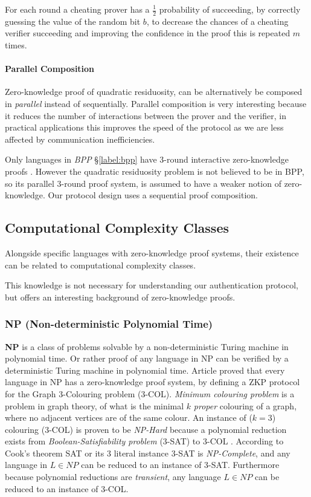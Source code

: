 For each round a cheating prover has a $\frac{1}{2}$ probability of succeeding, by correctly guessing the value of the random bit $b$, to decrease the chances of a cheating verifier succeeding and improving the confidence in the proof this is repeated $m$ times.

\paragraph{Parallel Composition}
Zero-knowledge proof of quadratic residuosity, can be alternatively be composed in \textit{parallel} instead of sequentially.
Parallel composition is very interesting because it reduces the number of interactions between the prover and the verifier, in practical applications this improves the speed of the protocol as we are less affected by communication inefficiencies.

Only languages in \textit{BPP} \S\ref{label:bpp} have 3-round interactive zero-knowledge proofs \cite{goldreich1996composition}. 
However the quadratic residuosity problem is not believed to be in BPP, so its parallel 3-round proof system, is assumed to have a weaker notion of zero-knowledge.
Our protocol design uses a sequential proof composition.

\subsection{Computational Complexity Classes}
Alongside specific languages with zero-knowledge proof systems, their existence can be related to computational complexity classes.

This knowledge is not necessary for understanding our authentication protocol, but offers an interesting background of zero-knowledge proofs.

\subsubsection{NP (Non-deterministic Polynomial Time)}

\textbf{NP} is a class of problems solvable by a non-deterministic Turing machine in polynomial time. 
Or rather proof of any language in NP can be verified by a deterministic Turing machine in polynomial time.
\bigskip
\newline
Article \cite{GMW} proved that every language in NP has a zero-knowledge proof system, by defining a ZKP protocol for the Graph 3-Colouring problem (3-COL).
\textit{Minimum colouring problem} is a problem in graph theory, of what is the minimal $k$ \textit{proper} colouring of a graph, where no adjacent vertices are of the same colour.
An instance of ($k=3$) colouring (3-COL) is proven to be \textit{NP-Hard} because a polynomial reduction exists from \textit{Boolean-Satisfiability problem} (3-SAT) to 3-COL \cite{mouatadid2014introduction}.
According to Cook's theorem \cite{cook1971complexity} SAT or its 3 literal instance 3-SAT is \textit{NP-Complete}, and any language in $L \in NP$ can be reduced to an instance of 3-SAT. 
Furthermore because polynomial reductions are \textit{transient}, any language $L \in NP$ can be reduced to an instance of 3-COL.

